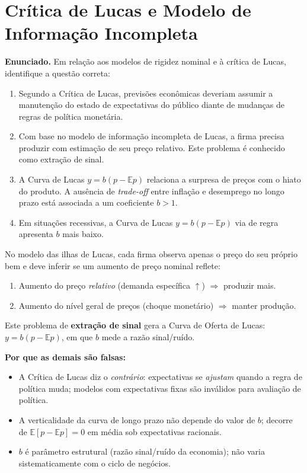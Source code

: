 \documentclass[12pt, a4paper]{article}
\newcommand{\E}{\mathbb{E}}
\begin{document}
\section{Crítica de Lucas e Modelo de Informação Incompleta}

\textbf{Enunciado.} Em relação aos modelos de rigidez nominal e à crítica de Lucas, identifique a questão correta:

\begin{enumerate}[label=\alph*)]
\item Segundo a Crítica de Lucas, previsões econômicas deveriam assumir a manutenção do estado de expectativas do público diante de mudanças de regras de política monetária.
\item Com base no modelo de informação incompleta de Lucas, a firma precisa produzir com estimação de seu preço relativo. Este problema é conhecido como extração de sinal.
\item A Curva de Lucas $y = b(p - \E p)$ relaciona a surpresa de preços com o hiato do produto. A ausência de \textit{trade-off} entre inflação e desemprego no longo prazo está associada a um coeficiente $b > 1$.
\item Em situações recessivas, a Curva de Lucas $y = b(p - \E p)$ via de regra apresenta $b$ mais baixo.
\end{enumerate}

\begin{correctbox}[title={Resposta correta: b)}]
No modelo das ilhas de Lucas, cada firma observa apenas o preço do seu próprio bem
e deve inferir se um aumento de preço nominal reflete:
\begin{enumerate}[leftmargin=*]
\item[(i)] Aumento do preço \emph{relativo} (demanda específica $\uparrow$)
  $\Rightarrow$ produzir mais.
\item[(ii)] Aumento do nível geral de preços (choque monetário)
  $\Rightarrow$ manter produção.
\end{enumerate}
Este problema de \textbf{extração de sinal} gera a Curva de Oferta de Lucas:
$y = b(p - \E p)$, em que $b$ mede a razão sinal/ruído. \checkmark

\textbf{Por que as demais são falsas:}
\begin{itemize}[leftmargin=*]
\item[a)] A Crítica de Lucas diz o \emph{contrário}: expectativas se \emph{ajustam} quando
a regra de política muda; modelos com expectativas fixas são inválidos para avaliação de política.
\item[c)] A verticalidade da curva de longo prazo não depende do valor de $b$;
decorre de $\E[p - \E p] = 0$ em média sob expectativas racionais.
\item[d)] $b$ é parâmetro estrutural (razão sinal/ruído da economia); não varia
sistematicamente com o ciclo de negócios.
\end{itemize}
\end{correctbox}
\end{document}
